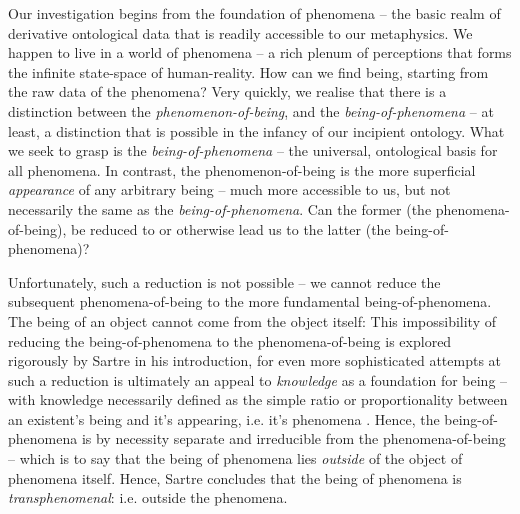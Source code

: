 Our investigation begins from the foundation of phenomena -- the basic realm of derivative ontological data that is readily accessible to our metaphysics. We happen to live in a world of phenomena -- a rich plenum of perceptions that forms the infinite state-space of human-reality. How can we find being, starting from the raw data of the phenomena? Very quickly, we realise that there is a distinction between the \emph{phenomenon-of-being}, and the \emph{being-of-phenomena} -- at least, a distinction that is possible in the infancy of our incipient ontology. What we seek to grasp is the \emph{being-of-phenomena} -- the universal, ontological basis for all phenomena. In contrast, the phenomenon-of-being is the more superficial \emph{appearance} of any arbitrary being -- much more accessible to us, but not necessarily the same as the \emph{being-of-phenomena}.  Can the former (the phenomena-of-being), be reduced to or otherwise lead us to the latter (the being-of-phenomena)? 

Unfortunately, such a reduction is not possible -- we cannot reduce the subsequent phenomena-of-being to the more fundamental being-of-phenomena. The being of an object cannot come from the object itself:  This impossibility of reducing the being-of-phenomena to the phenomena-of-being is explored rigorously by Sartre in his introduction, for even more sophisticated attempts at such a reduction is ultimately an appeal to \emph{knowledge} as a foundation for being -- with knowledge necessarily defined as the simple ratio or proportionality between an existent's being and it's appearing, i.e. it's phenomena \autocite[7]{Sartre}. Hence, the being-of-phenomena is by necessity separate and irreducible from the phenomena-of-being -- which is to say that the being of phenomena lies \emph{outside} of the object of phenomena itself.  Hence, Sartre concludes that the being of phenomena is \emph{transphenomenal}: i.e. outside the phenomena.

